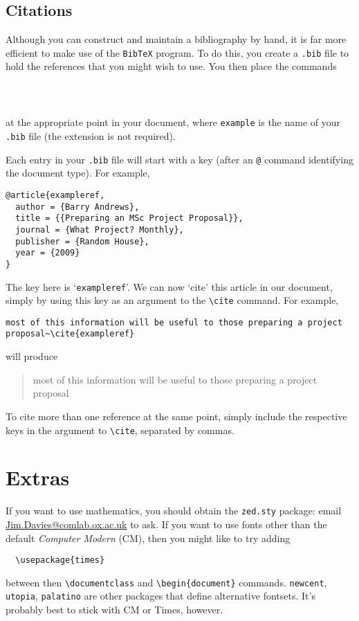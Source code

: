 \documentclass[dissertation]{softeng}
\begin{document}
\subsection{Citations}

Although you can construct and maintain a bibliography by hand, it is
far more efficient to make use of the \verb|BibTeX| program.  To do
this, you create a \verb|.bib| file to hold the references that you
might wish to use.  You then place the commands
\begin{verbatim}
  
  
\end{verbatim}
at the appropriate point in your document, where \verb|example| is
the name of your \verb|.bib| file (the extension is not required). 

Each entry in your \verb|.bib| file will start with a key (after an
\verb|@| command identifying the document type).  For example,  
\begin{verbatim}
@article{exampleref,
  author = {Barry Andrews},
  title = {{Preparing an MSc Project Proposal}},
  journal = {What Project? Monthly},
  publisher = {Random House},
  year = {2009}
}
\end{verbatim}
The key here is `\verb|exampleref|'.  We can now `cite' this article
in our document, simply by using this key as an argument to the
\verb|\cite| command.   For example,
\begin{verbatim}
most of this information will be useful to those preparing a project
proposal~\cite{exampleref}
\end{verbatim}
will produce
\begin{quote}\raggedright
  most of this information will be useful to those preparing a project
  proposal~\cite{exampleref}
\end{quote}
To cite more than one reference at the same point, simply include the
respective keys in the argument to \verb|\cite|, separated by commas.

\section{Extras}

If you want to use mathematics, you should obtain the \verb|zed.sty|
package: email \url{Jim.Davies@comlab.ox.ac.uk} to ask.  If you want
to use fonts other than the default \emph{Computer Modern} (CM), then
you might like to try adding
\begin{verbatim}
  \usepackage{times}
\end{verbatim}
between then \verb|\documentclass| and \verb|\begin{document}|
  commands.  \verb|newcent|, \verb|utopia|, \verb|palatino| are other
  packages that define alternative fontsets.  It's probably best to
  stick with CM or Times, however.  
\end{document}
